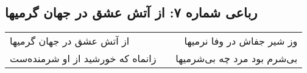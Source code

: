 \begin{center}
\section*{رباعی شماره ۷: از آتش عشق در جهان گرمیها}
\label{sec:0007}
\begin{longtable}{l p{0.5cm} r}
از آتش عشق در جهان گرمیها
&&
وز شیر جفاش در وفا نرمیها
\\
زانماه که خورشید از او شرمنده‌ست
&&
بی‌شرم بود مرد چه بی‌شرمیها
\\
\end{longtable}
\end{center}
